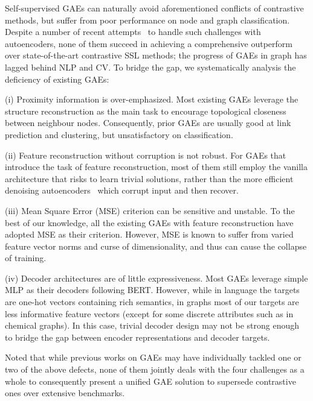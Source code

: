 { 
Self-supervised GAEs can naturally avoid aforementioned conflicts of contrastive methods, but suffer from poor performance on node and graph classification. 
Despite a number of recent attempts~\cite{you2020does,manessi2021graph,zhu2020self,jin2020self,hu2020strategies} to handle such challenges with autoencoders, none of them succeed in achieving a comprehensive outperform over state-of-the-art contrastive SSL methods; 
the progress of GAEs in graph has lagged behind NLP and CV. To bridge the gap, we systematically analysis the deficiency of existing GAEs:

(i) Proximity information is over-emphasized. 
Most existing GAEs leverage the structure reconstruction as the main task to encourage topological closeness between neighbour nodes.
Consequently, prior GAEs are usually good at link prediction and clustering, but unsatisfactory on classification.

(ii) Feature reconstruction without corruption is not robust. 
For GAEs that introduce the task of feature reconstruction, 
most of them still employ the vanilla architecture that risks to learn trivial solutions, rather than the more efficient denoising autoencoders~\cite{vincent2008extracting} which corrupt input and then recover.

(iii) Mean Square Error (MSE) criterion can be sensitive and unstable. 
To the best of our knowledge, all the existing GAEs with feature reconstruction have adopted MSE as their criterion. 
However, MSE is known to suffer from varied feature vector norms and curse of dimensionality, and thus can cause the collapse of training. 

(iv) Decoder architectures are of little expressiveness. 
Most GAEs leverage simple MLP as their decoders following BERT. 
However, while in language the targets are one-hot vectors containing rich semantics, in graphs most of our targets are less informative feature vectors (except for some discrete attributes such as in chemical graphs). 
In this case, trivial decoder design may not be strong enough to bridge the gap between encoder representations and decoder targets.

Noted that while previous works on GAEs may have individually tackled one or two of the above defects, none of them jointly deals with the four challenges as a whole to consequently present a unified GAE solution to supersede contrastive ones over extensive benchmarks.


}

